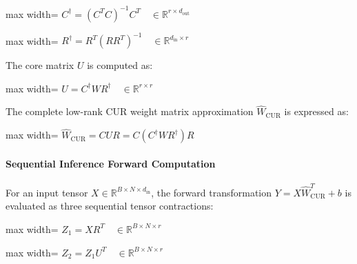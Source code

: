 \begin{center}
\begin{adjustbox}{max width=\columnwidth}
$\displaystyle
C^\dagger = (C^T C)^{-1} C^T \quad \in \mathbb{R}^{r \times d_{\text{out}}}
$
\end{adjustbox}
\end{center}

\begin{center}
\begin{adjustbox}{max width=\columnwidth}
$\displaystyle
R^\dagger = R^T (R R^T)^{-1} \quad \in \mathbb{R}^{d_{\text{in}} \times r}
$
\end{adjustbox}
\end{center}

The core matrix $U$ is computed as:

\begin{center}
\begin{adjustbox}{max width=\columnwidth}
$\displaystyle
U = C^\dagger W R^\dagger \quad \in \mathbb{R}^{r \times r}
$
\end{adjustbox}
\end{center}

The complete low-rank CUR weight matrix approximation $\hat{W}_{\text{CUR}}$ is expressed as:

\begin{center}
\begin{adjustbox}{max width=\columnwidth}
$\displaystyle
\hat{W}_{\text{CUR}} = C U R = C \left( C^\dagger W R^\dagger \right) R
$
\end{adjustbox}
\end{center}

\paragraph{Sequential Inference Forward Computation}
For an input tensor $X \in \mathbb{R}^{B \times N \times d_{\text{in}}}$, the forward transformation $Y = X \hat{W}_{\text{CUR}}^T + b$ is evaluated as three sequential tensor contractions:

\begin{center}
\begin{adjustbox}{max width=\columnwidth}
$\displaystyle
Z_1 = X R^T \quad \in \mathbb{R}^{B \times N \times r}
$
\end{adjustbox}
\end{center}

\begin{center}
\begin{adjustbox}{max width=\columnwidth}
$\displaystyle
Z_2 = Z_1 U^T \quad \in \mathbb{R}^{B \times N \times r}
$
\end{adjustbox}
\end{center}

